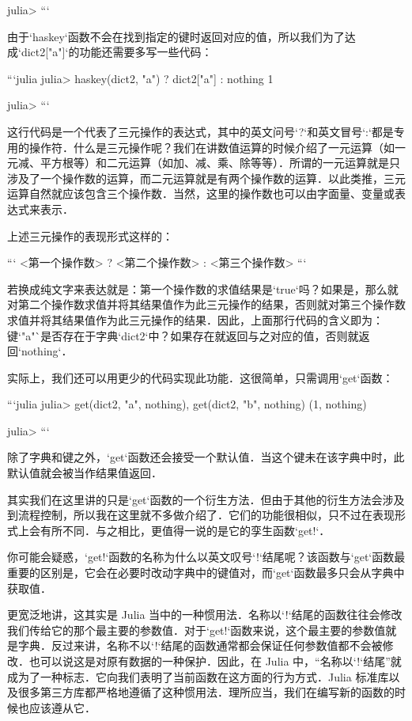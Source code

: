 julia>
```

由于`haskey`函数不会在找到指定的键时返回对应的值，所以我们为了达成`dict2["a"]`的功能还需要多写一些代码：

```julia
julia> haskey(dict2, "a") ? dict2["a"] : nothing
1

julia> 
```

这行代码是一个代表了三元操作的表达式，其中的英文问号`?`和英文冒号`:`都是专用的操作符．什么是三元操作呢？我们在讲数值运算的时候介绍了一元运算（如一元减、平方根等）和二元运算（如加、减、乘、除等等）．所谓的一元运算就是只涉及了一个操作数的运算，而二元运算就是有两个操作数的运算．以此类推，三元运算自然就应该包含三个操作数．当然，这里的操作数也可以由字面量、变量或表达式来表示．

上述三元操作的表现形式这样的：

```
<第一个操作数> ? <第二个操作数> : <第三个操作数>
```

若换成纯文字来表达就是：第一个操作数的求值结果是`true`吗？如果是，那么就对第二个操作数求值并将其结果值作为此三元操作的结果，否则就对第三个操作数求值并将其结果值作为此三元操作的结果．因此，上面那行代码的含义即为：键`"a"`是否存在于字典`dict2`中？如果存在就返回与之对应的值，否则就返回`nothing`．

实际上，我们还可以用更少的代码实现此功能．这很简单，只需调用`get`函数：

```julia
julia> get(dict2, "a", nothing), get(dict2, "b", nothing)
(1, nothing)

julia> 
```

除了字典和键之外，`get`函数还会接受一个默认值．当这个键未在该字典中时，此默认值就会被当作结果值返回．

其实我们在这里讲的只是`get`函数的一个衍生方法．但由于其他的衍生方法会涉及到流程控制，所以我在这里就不多做介绍了．它们的功能很相似，只不过在表现形式上会有所不同．与之相比，更值得一说的是它的孪生函数`get!`．

你可能会疑惑，`get!`函数的名称为什么以英文叹号`!`结尾呢？该函数与`get`函数最重要的区别是，它会在必要时改动字典中的键值对，而`get`函数最多只会从字典中获取值．

更宽泛地讲，这其实是 Julia 当中的一种惯用法．名称以`!`结尾的函数往往会修改我们传给它的那个最主要的参数值．对于`get!`函数来说，这个最主要的参数值就是字典．反过来讲，名称不以`!`结尾的函数通常都会保证任何参数值都不会被修改．也可以说这是对原有数据的一种保护．因此，在 Julia 中，“名称以`!`结尾”就成为了一种标志．它向我们表明了当前函数在这方面的行为方式．Julia 标准库以及很多第三方库都严格地遵循了这种惯用法．理所应当，我们在编写新的函数的时候也应该遵从它．

